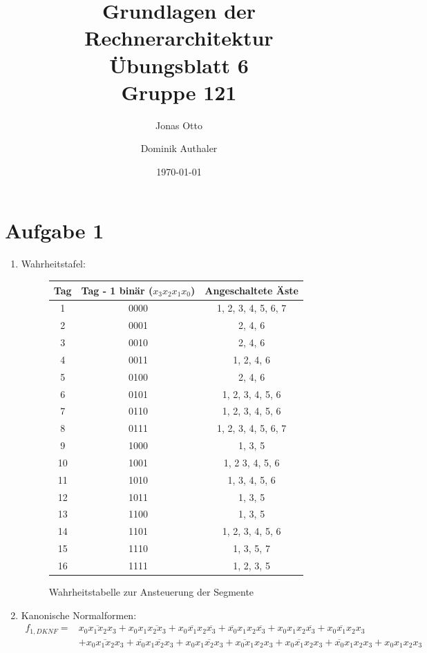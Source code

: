 \documentclass[a4paper]{article}
\title{Grundlagen der Rechnerarchitektur\\ Übungsblatt 6\\Gruppe 121\\}
\author{Jonas Otto\and Dominik Authaler}
\date{\today}
\begin{document}
\maketitle

\section*{Aufgabe 1}
\begin{enumerate}[label=\alph*)]
	\item Wahrheitstafel:
	\begin{figure}[h!]
		\centering
		\begin{tabular}{|c|c|c|}
			\hline
			Tag & Tag - 1 binär ($x_3x_2x_1x_0$) & Angeschaltete Äste \\
			\hline
			1 & 0000 & 1, 2, 3, 4, 5, 6, 7\\
			2 & 0001 & 2, 4, 6\\
			3 & 0010 & 2, 4, 6\\
			4 & 0011 & 1, 2, 4, 6\\
			5 & 0100 & 2, 4, 6\\
			6 & 0101 & 1, 2, 3, 4, 5, 6\\
			7 & 0110 & 1, 2, 3, 4, 5, 6\\
			8 & 0111 & 1, 2, 3, 4, 5, 6, 7\\
			9 & 1000 & 1, 3, 5\\
			10 & 1001 & 1, 2 3, 4, 5, 6\\
			11 & 1010 & 1, 3, 4, 5, 6\\
			12 & 1011 & 1, 3, 5\\
			13 & 1100 & 1, 3, 5\\
			14 & 1101 & 1, 2, 3, 4, 5, 6\\
			15 & 1110 & 1, 3, 5, 7\\
			16 & 1111 & 1, 2, 3, 5\\
			\hline
		\end{tabular}
		\caption{Wahrheitstabelle zur Ansteuerung der Segmente}
	\end{figure}

	\item Kanonische Normalformen:
	\begin{equation*}
	\begin{aligned}
		f_{1, DKNF} = &\overline{x_0 x_1 x_2 x_3} + x_0 x_1\overline{x_2 x_3} + x_0 \overline{x_1} x_2 \overline{x_3} + \overline{x_0} x_1 x_2 \overline{x_3} + x_0 x_1 x_2 \overline{x_3} + \overline{x_0 x_1 x_2} x_3 \\
		&+ x_0 \overline{x_1 x_2} x_3 + \overline{x_0} x_1 \overline{x_2} x_3 + x_0 x_1 \overline{x_2} x_3 + \overline{x_0 x_1} x_2 x_3 + x_0 \overline{x_1} x_2 x_3 + \overline{x_0}x_1 x_2 x_3 + x_0 x_1 x_2 x_3
	\end{aligned}
	\end{equation*}
	

\end{enumerate}
\end{document}
